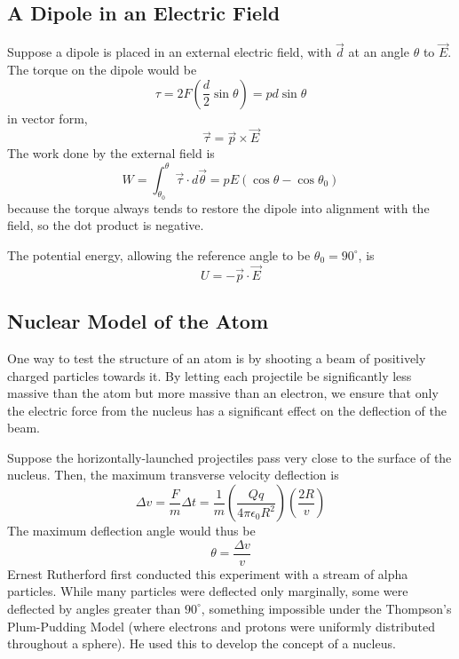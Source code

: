 \documentclass[../PhysicsFormulae.tex]{subfiles}
\begin{document}
\subsection{A Dipole in an Electric Field}
Suppose a dipole is placed in an external electric field, with $\vec{d}$ at an angle $\theta$ to $\vec{E}$. The torque on the dipole would be
\[ \tau = 2F\left(\frac{d}{2}\sin{\theta}\right) = pd\sin{\theta} \]
in vector form, 
\[ \vec{\tau} = \vec{p} \times \vec{E} \]
The work done by the external field is 
\[ W = \int_{\theta_0}^{\theta}\vec{\tau} \cdot d\vec{\theta} = pE(\cos{\theta} - \cos{\theta_0} ) \]
because the torque always tends to restore the dipole into alignment with the field, so the dot product is negative. \bigskip

The potential energy, allowing the reference angle to be $\theta_0 = 90^{\circ}$, is
\[ U = -\vec{p} \cdot \vec{E} \]

\subsection{Nuclear Model of the Atom}
One way to test the structure of an atom is by shooting a beam of positively charged particles towards it. By letting each projectile be significantly less massive than the atom but more massive than an electron, we ensure that only the electric force from the nucleus has a significant effect on the deflection of the beam. \bigskip

Suppose the horizontally-launched projectiles pass very close to the surface of the nucleus. Then, the maximum transverse velocity deflection is
\[ \Delta v = \frac{F}{m} \Delta t = \frac{1}{m} \left(\frac{Qq}{4\pi\epsilon_0 R^2} \right) \left( \frac{2R}{v} \right) \]
The maximum deflection angle would thus be 
\[ \theta = \frac{\Delta v}{v} \]
Ernest Rutherford first conducted this experiment with a stream of alpha particles. While many particles were deflected only marginally, some were deflected by angles greater than $90^{\circ}$, something impossible under the Thompson's Plum-Pudding Model (where electrons and protons were uniformly distributed throughout a sphere). He used this to develop the concept of a nucleus. 
\end{document}
